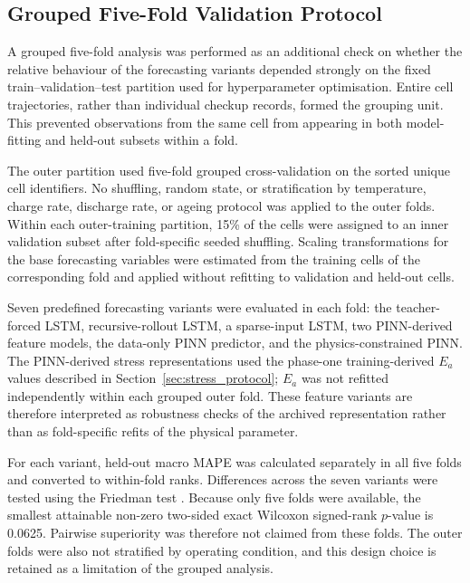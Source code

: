 \documentclass[a4paper,fleqn]{cas-sc}
\begin{document}

\subsection{Grouped Five-Fold Validation Protocol}
\label{sec:grouped_cv}

A grouped five-fold analysis was performed as an additional check on whether the relative behaviour of the forecasting variants depended strongly on the fixed train--validation--test partition used for hyperparameter optimisation. Entire cell trajectories, rather than individual checkup records, formed the grouping unit. This prevented observations from the same cell from appearing in both model-fitting and held-out subsets within a fold.

The outer partition used five-fold grouped cross-validation on the sorted unique cell identifiers. No shuffling, random state, or stratification by temperature, charge rate, discharge rate, or ageing protocol was applied to the outer folds. Within each outer-training partition, 15\% of the cells were assigned to an inner validation subset after fold-specific seeded shuffling. Scaling transformations for the base forecasting variables were estimated from the training cells of the corresponding fold and applied without refitting to validation and held-out cells.

Seven predefined forecasting variants were evaluated in each fold: the teacher-forced LSTM, recursive-rollout LSTM, a sparse-input LSTM, two PINN-derived feature models, the data-only PINN predictor, and the physics-constrained PINN. The PINN-derived stress representations used the phase-one training-derived $E_a$ values described in Section~\ref{sec:stress_protocol}; $E_a$ was not refitted independently within each grouped outer fold. These feature variants are therefore interpreted as robustness checks of the archived representation rather than as fold-specific refits of the physical parameter.

For each variant, held-out macro MAPE was calculated separately in all five folds and converted to within-fold ranks. Differences across the seven variants were tested using the Friedman test \cite{friedman1937ranks}. Because only five folds were available, the smallest attainable non-zero two-sided exact Wilcoxon signed-rank $p$-value is 0.0625. Pairwise superiority was therefore not claimed from these folds. The outer folds were also not stratified by operating condition, and this design choice is retained as a limitation of the grouped analysis.
\end{document}
